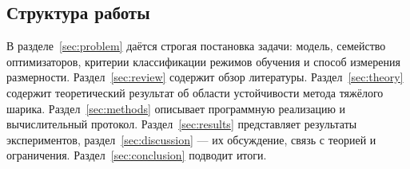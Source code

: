 \subsection{Структура работы}

В разделе~\ref{sec:problem} даётся строгая постановка задачи: модель, семейство
оптимизаторов, критерии классификации режимов обучения и способ измерения
размерности. Раздел~\ref{sec:review} содержит обзор литературы.
Раздел~\ref{sec:theory} содержит теоретический результат об области устойчивости
метода тяжёлого шарика. Раздел~\ref{sec:methods} описывает программную
реализацию и вычислительный протокол. Раздел~\ref{sec:results} представляет
результаты экспериментов, раздел~\ref{sec:discussion} --- их обсуждение,
связь с теорией и ограничения. Раздел~\ref{sec:conclusion} подводит итоги.

